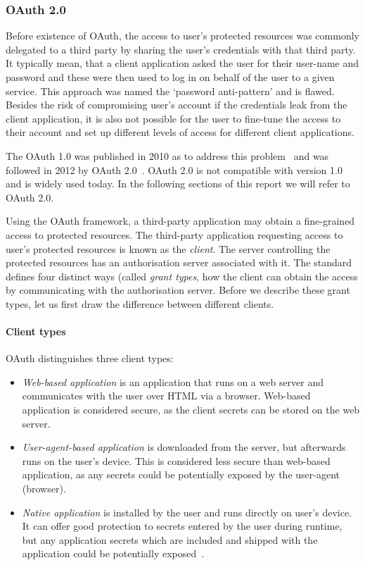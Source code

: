 \subsubsection{OAuth 2.0} \label{sec:OAuth_2}

Before existence of OAuth, the access to user's protected resources was commonly delegated to a third party by sharing the user's credentials with that third party. It typically mean, that a client application asked the user for their user-name and password and these were then used to log in on behalf of the user to a given service. This approach was named the `password anti-pattern' and is flawed. 
Besides the risk of compromising user's account if the credentials leak from the client application, it is also not possible for the user to fine-tune the access to their account and set up different levels of access for different client applications. 

The OAuth 1.0 was published in 2010 as to address this problem~\cite{Hammer-Lahav2010TheProtocol} and was followed in 2012 by OAuth 2.0~\cite{Hardt2012TheFramework}. OAuth 2.0 is not compatible with version 1.0 and is widely used today. In the following sections of this report we will refer to OAuth 2.0.

Using the OAuth framework, a third-party application may obtain a fine-grained access to protected resources. The third-party application requesting access to user's protected resources is known as the \textit{client}. The server controlling the protected resources has an authorisation server associated with it. The standard defines four distinct ways (called \textit{grant types}, how the client can obtain the access by communicating with the authorisation server. Before we describe these grant types, let us first draw the difference between different clients.

\paragraph{Client types} OAuth distinguishes three client types:
\begin{itemize}[noitemsep]
    \item \textit{Web-based application} is an application that runs on a web server and communicates with the user over HTML via a browser. Web-based application is considered secure, as the client secrets can be stored on the web server.
    \item \textit{User-agent-based application} is downloaded from the server, but afterwards runs on the user's device. This is considered less secure than web-based application, as any secrets could be potentially exposed by the user-agent (browser).
    \item \textit{Native application} is installed by the user and runs directly on user's device. It can offer good protection to secrets entered by the user during runtime, but any application secrets which are included and shipped with the application could be potentially exposed~\cite{Hardt2012TheFramework}.
\end{itemize}

